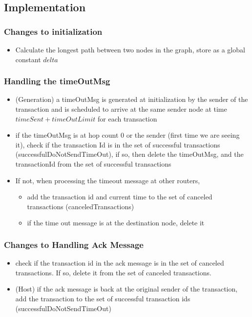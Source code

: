 \documentclass[a4paper]{article}
\begin{document}
\subsection{Implementation}
\subsubsection{ Changes to initialization}
    \begin{itemize}
        \item Calculate the longest path between two nodes in the graph, store as a global constant $delta$
    \end{itemize}

\subsubsection{ Handling the timeOutMsg}
    \begin{itemize}
        \item (Generation) a timeOutMsg is generated at initialization by the sender of the transaction and is scheduled to arrive at the same sender node at time $timeSent + timeOutLimit$  for each transaction
        \item if the timeOutMsg is at hop count 0 or the sender (first time we are seeing it), check if the transaction Id is in the set of successful transactions (successfulDoNotSendTimeOut), if so, then delete the timeOutMsg, and the transactionId from the set of successful transactions
        \item If not, when processing the timeout message at other routers, 
        \begin{itemize}
            \item add the transaction id and current time to the set of canceled transactions (canceledTransactions)
            \item if the time out message is at the destination node, delete it
        \end{itemize}
    \end{itemize}
\subsubsection{ Changes to Handling Ack Message}
    \begin{itemize}
        \item check if the transaction id in the ack message is in the set of canceled transactions. If so, delete it from the set of canceled transactions.
        \item (Host) if the ack message is back at the original sender of the transaction, add the transaction to the set of successful transaction ids (successfulDoNotSendTimeOut)

    \end{itemize}
\end{document}
